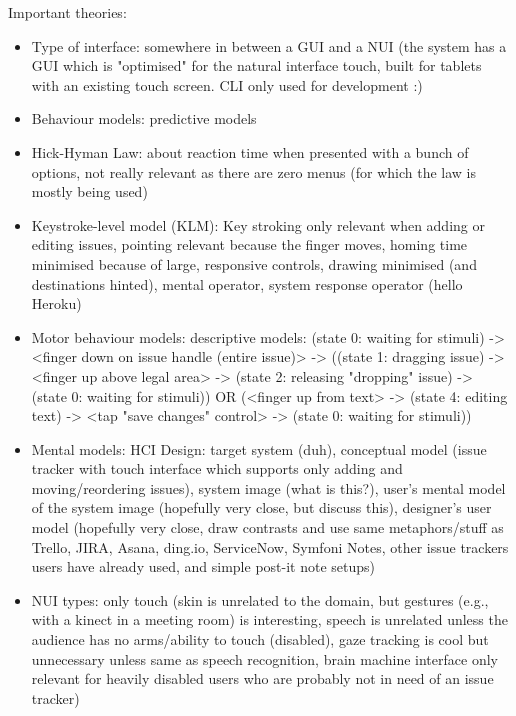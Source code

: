 Important theories:

\begin{itemize}
  \item Type of interface: somewhere in between a GUI and a NUI (the system has a GUI which is "optimised" for the natural interface touch, built for tablets with an existing touch screen. CLI only used for development :)
  \item Behaviour models: predictive models
  \item Hick-Hyman Law: about reaction time when presented with a bunch of options, not really relevant as there are zero menus (for which the law is mostly being used)
  \item Keystroke-level model (KLM): Key stroking only relevant when adding or editing issues, pointing relevant because the finger moves, homing time minimised because of large, responsive controls, drawing minimised (and destinations hinted), mental operator, system response operator (hello Heroku) %
  \item Motor behaviour models: descriptive models: (state 0: waiting for stimuli) -> <finger down on issue handle (entire issue)> -> ((state 1: dragging issue) -> <finger up above legal area> -> (state 2: releasing "dropping" issue) -> (state 0: waiting for stimuli)) OR (<finger up from text> -> (state 4: editing text) -> <tap "save changes" control> -> (state 0: waiting for stimuli))
  \item Mental models: HCI Design: target system (duh), conceptual model (issue tracker with touch interface which supports only adding and moving/reordering issues), system image (what is this?), user's mental model of the system image (hopefully very close, but discuss this), designer's user model (hopefully very close, draw contrasts and use same metaphors/stuff as Trello, JIRA, Asana, ding.io, ServiceNow, Symfoni Notes, other issue trackers users have already used, and simple post-it note setups) %
  \item NUI types: only touch (skin is unrelated to the domain, but gestures (e.g., with a kinect in a meeting room) is interesting, speech is unrelated unless the audience has no arms/ability to touch (disabled), gaze tracking is cool but unnecessary unless same as speech recognition, brain machine interface only relevant for heavily disabled users who are probably not in need of an issue tracker)

\end{itemize}
